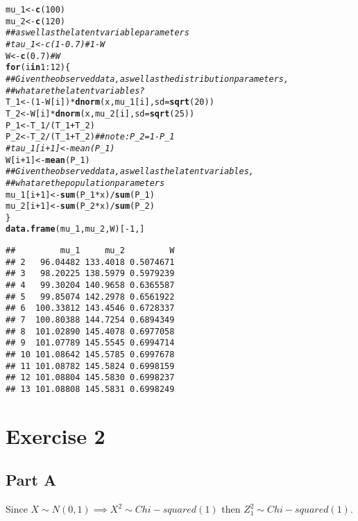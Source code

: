 \documentclass{article}\usepackage[]{graphicx}\usepackage[]{color}
\makeatletter
\newcommand{\hlnum}[1]{\textcolor[rgb]{0.686,0.059,0.569}{#1}}%
\newcommand{\hlcom}[1]{\textcolor[rgb]{0.678,0.584,0.686}{\textit{#1}}}%
\newcommand{\hlopt}[1]{\textcolor[rgb]{0,0,0}{#1}}%
\newcommand{\hlstd}[1]{\textcolor[rgb]{0.345,0.345,0.345}{#1}}%
\newcommand{\hlkwa}[1]{\textcolor[rgb]{0.161,0.373,0.58}{\textbf{#1}}}%
\newcommand{\hlkwb}[1]{\textcolor[rgb]{0.69,0.353,0.396}{#1}}%
\newcommand{\hlkwc}[1]{\textcolor[rgb]{0.333,0.667,0.333}{#1}}%
\newcommand{\hlkwd}[1]{\textcolor[rgb]{0.737,0.353,0.396}{\textbf{#1}}}%
\newenvironment{kframe}{%
 \def\at@end@of@kframe{}%
 \ifinner\ifhmode%
  \def\at@end@of@kframe{\end{minipage}}%
  \begin{minipage}{\columnwidth}%
 \fi\fi%
 \def\FrameCommand##1{\hskip\@totalleftmargin \hskip-\fboxsep
 \colorbox{shadecolor}{##1}\hskip-\fboxsep
     \hskip-\linewidth \hskip-\@totalleftmargin \hskip\columnwidth}%
 \MakeFramed {\advance\hsize-\width
   \@totalleftmargin\z@ \linewidth\hsize
   \@setminipage}}%
 {\par\unskip\endMakeFramed%
 \at@end@of@kframe}
\newenvironment{knitrout}{}{} %
\makeatother
\begin{document}
\begin{knitrout}
\begin{kframe}
\begin{alltt}
\hlstd{mu_1} \hlkwb{<-} \hlkwd{c}\hlstd{(}\hlnum{100}\hlstd{)}
\hlstd{mu_2} \hlkwb{<-} \hlkwd{c}\hlstd{(}\hlnum{120}\hlstd{)}
\hlcom{## as well as the latent variable parameters}
\hlcom{#tau_1 <- c(1-0.7) # 1-W}
\hlstd{W} \hlkwb{<-} \hlkwd{c}\hlstd{(}\hlnum{0.7}\hlstd{)} \hlcom{# W}
\hlkwa{for}\hlstd{( i} \hlkwa{in} \hlnum{1}\hlopt{:}\hlnum{12}\hlstd{) \{}
  \hlcom{## Given the observed data, as well as the distribution parameters,}
  \hlcom{## what are the latent variables?}
  \hlstd{T_1} \hlkwb{<-} \hlstd{(}\hlnum{1}\hlopt{-}\hlstd{W[i])} \hlopt{*} \hlkwd{dnorm}\hlstd{(x, mu_1[i],} \hlkwc{sd} \hlstd{=} \hlkwd{sqrt}\hlstd{(}\hlnum{20}\hlstd{))}
  \hlstd{T_2} \hlkwb{<-} \hlstd{W[i]} \hlopt{*} \hlkwd{dnorm}\hlstd{(x, mu_2[i],} \hlkwc{sd} \hlstd{=} \hlkwd{sqrt}\hlstd{(}\hlnum{25}\hlstd{))}
  \hlstd{P_1} \hlkwb{<-} \hlstd{T_1} \hlopt{/} \hlstd{(T_1} \hlopt{+} \hlstd{T_2)}
  \hlstd{P_2} \hlkwb{<-} \hlstd{T_2} \hlopt{/} \hlstd{(T_1} \hlopt{+} \hlstd{T_2)} \hlcom{## note: P_2 = 1 - P_1}
  \hlcom{#tau_1[i+1] <- mean(P_1)}
  \hlstd{W[i}\hlopt{+}\hlnum{1}\hlstd{]} \hlkwb{<-} \hlkwd{mean}\hlstd{(P_1)}
  \hlcom{## Given the observed data, as well as the latent variables,}
  \hlcom{## what are the population parameters}
  \hlstd{mu_1[i}\hlopt{+}\hlnum{1}\hlstd{]} \hlkwb{<-} \hlkwd{sum}\hlstd{( P_1} \hlopt{*} \hlstd{x)} \hlopt{/} \hlkwd{sum}\hlstd{(P_1)}
  \hlstd{mu_2[i}\hlopt{+}\hlnum{1}\hlstd{]} \hlkwb{<-} \hlkwd{sum}\hlstd{( P_2} \hlopt{*} \hlstd{x)} \hlopt{/} \hlkwd{sum}\hlstd{(P_2)}
\hlstd{\}}
\hlkwd{data.frame}\hlstd{(mu_1, mu_2, W)[}\hlopt{-}\hlnum{1}\hlstd{,]}
\end{alltt}
\begin{verbatim}
##         mu_1     mu_2         W
## 2   96.04482 133.4018 0.5074671
## 3   98.20225 138.5979 0.5979239
## 4   99.30204 140.9658 0.6365587
## 5   99.85074 142.2978 0.6561922
## 6  100.33812 143.4546 0.6728337
## 7  100.80388 144.7254 0.6894349
## 8  101.02890 145.4078 0.6977058
## 9  101.07789 145.5545 0.6994714
## 10 101.08642 145.5785 0.6997678
## 11 101.08782 145.5824 0.6998159
## 12 101.08804 145.5830 0.6998237
## 13 101.08808 145.5831 0.6998249
\end{verbatim}
\end{kframe}
\end{knitrout}
\section*{Exercise 2}
\subsection*{Part A}
Since $X\sim N(0,1) \implies X^2 \sim Chi-squared(1)$ then $Z_{1}^{2} \sim Chi-squared(1)$.
\end{document}
